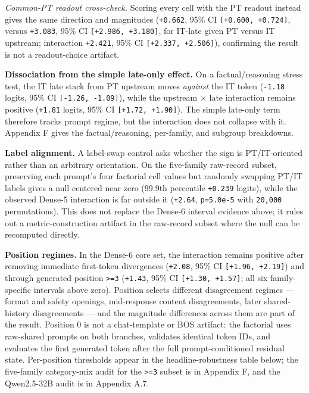 \documentclass[11pt]{article}
\begin{document}
\emph{Common-PT readout cross-check.} Scoring every cell with the PT readout instead gives the same direction and magnitudes (\texttt{+0.662}, 95\% CI \texttt{[+0.600, +0.724]}, versus \texttt{+3.083}, 95\% CI \texttt{[+2.986, +3.180]}, for IT-late given PT versus IT upstream; interaction \texttt{+2.421}, 95\% CI \texttt{[+2.337, +2.506]}), confirming the result is not a readout-choice artifact.

\textbf{Dissociation from the simple late-only effect.} On a factual/reasoning stress test, the IT late stack from PT upstream moves \emph{against} the IT token (\texttt{-1.18} logits, 95\% CI \texttt{[-1.26, -1.09]}), while the upstream \ensuremath{\times} late interaction remains positive (\texttt{+1.81} logits, 95\% CI \texttt{[+1.72, +1.90]}). The simple late-only term therefore tracks prompt regime, but the interaction does not collapse with it. Appendix F gives the factual/reasoning, per-family, and subgroup breakdowns.

\textbf{Label alignment.} A label-swap control asks whether the sign is PT/IT-oriented rather than an arbitrary orientation. On the five-family raw-record subset, preserving each prompt's four factorial cell values but randomly swapping PT/IT labels gives a null centered near zero (99.9th percentile \texttt{+0.239} logits), while the observed Dense-5 interaction is far outside it (\texttt{+2.64}, \texttt{p=5.0e-5} with \texttt{20,000} permutations). This does not replace the Dense-6 interval evidence above; it rules out a metric-construction artifact in the raw-record subset where the null can be recomputed directly.

\textbf{Position regimes.} In the Dense-6 core set, the interaction remains positive after removing immediate first-token divergences (\texttt{+2.08}, 95\% CI \texttt{[+1.96, +2.19]}) and through generated position \texttt{>=3} (\texttt{+1.43}, 95\% CI \texttt{[+1.30, +1.57]}; all six family-specific intervals above zero). Position selects different disagreement regimes --- format and safety openings, mid-response content disagreements, later shared-history disagreements --- and the magnitude differences across them are part of the result. Position 0 is not a chat-template or BOS artifact: the factorial uses raw-shared prompts on both branches, validates identical token IDs, and evaluates the first generated token after the full prompt-conditioned residual state. Per-position thresholds appear in the headline-robustness table below; the five-family category-mix audit for the \texttt{>=3} subset is in Appendix F, and the Qwen2.5-32B audit is in Appendix A.7.
\end{document}
